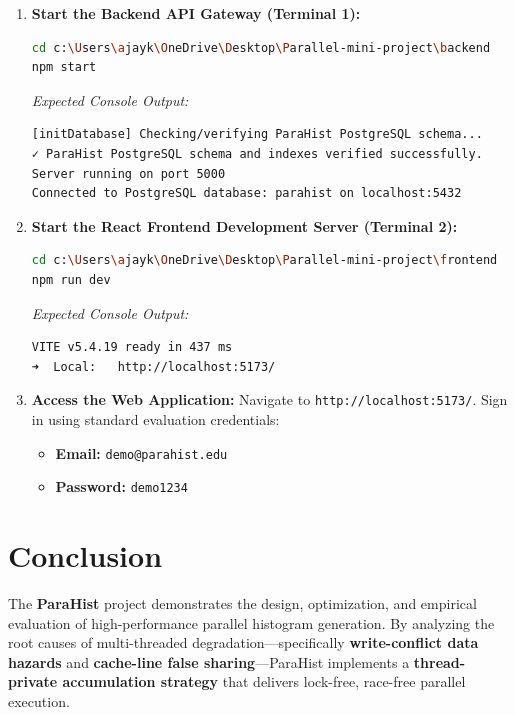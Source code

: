 \documentclass[12pt,a4paper,oneside]{report}
\begin{document}
\begin{enumerate}
    \item \textbf{Start the Backend API Gateway (Terminal 1):}
    \begin{lstlisting}[language=bash]
cd c:\Users\ajayk\OneDrive\Desktop\Parallel-mini-project\backend
npm start
    \end{lstlisting}
    \textit{Expected Console Output:}
    \begin{verbatim}
[initDatabase] Checking/verifying ParaHist PostgreSQL schema...
✓ ParaHist PostgreSQL schema and indexes verified successfully.
Server running on port 5000
Connected to PostgreSQL database: parahist on localhost:5432
    \end{verbatim}

    \item \textbf{Start the React Frontend Development Server (Terminal 2):}
    \begin{lstlisting}[language=bash]
cd c:\Users\ajayk\OneDrive\Desktop\Parallel-mini-project\frontend
npm run dev
    \end{lstlisting}
    \textit{Expected Console Output:}
    \begin{verbatim}
VITE v5.4.19 ready in 437 ms
➜  Local:   http://localhost:5173/
    \end{verbatim}

    \item \textbf{Access the Web Application:}
    Navigate to \texttt{http://localhost:5173/}. Sign in using standard evaluation credentials:
    \begin{itemize}
        \item \textbf{Email:} \texttt{demo@parahist.edu}
        \item \textbf{Password:} \texttt{demo1234}
    \end{itemize}
\end{enumerate}

\section{Conclusion}
The \textbf{ParaHist} project demonstrates the design, optimization, and empirical evaluation of high-performance parallel histogram generation. By analyzing the root causes of multi-threaded degradation---specifically \textbf{write-conflict data hazards} and \textbf{cache-line false sharing}---ParaHist implements a \textbf{thread-private accumulation strategy} that delivers lock-free, race-free parallel execution.
\end{document}

